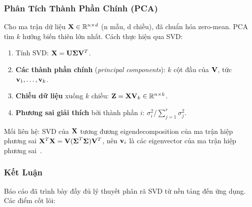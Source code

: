 \subsubsection{Phân Tích Thành Phần Chính (PCA)}

Cho ma trận dữ liệu $\mathbf{X} \in \mathbb{R}^{n \times d}$ (n mẫu, d chiều), đã chuẩn hóa
zero-mean. PCA tìm $k$ hướng biến thiên lớn nhất. Cách thực hiện qua SVD:

\begin{enumerate}[noitemsep]
    \item Tính SVD: $\mathbf{X} = \mathbf{U}\boldsymbol{\Sigma}\mathbf{V}^T$.
    \item \textbf{Các thành phần chính} (\textit{principal components}):
          $k$ cột đầu của $\mathbf{V}$, tức $\mathbf{v}_1, \ldots, \mathbf{v}_k$.
    \item \textbf{Chiếu dữ liệu} xuống $k$ chiều: $\mathbf{Z} = \mathbf{X}\mathbf{V}_k \in \mathbb{R}^{n \times k}$.
    \item \textbf{Phương sai giải thích} bởi thành phần $i$:
          $\sigma_i^2 / \sum_{j=1}^r \sigma_j^2$.
\end{enumerate}

Mối liên hệ: SVD của $\mathbf{X}$ tương đương eigendecomposition của ma trận hiệp
phương sai $\mathbf{X}^T\mathbf{X} = \mathbf{V}(\boldsymbol{\Sigma}^T\boldsymbol{\Sigma})\mathbf{V}^T$,
nên $\mathbf{v}_i$ là các eigenvector của ma trận hiệp phương sai~\cite{higham2002}.

\subsubsection{Kết Luận}

Báo cáo đã trình bày đầy đủ lý thuyết phân rã SVD từ nền tảng đến ứng dụng.
Các điểm cốt lõi:

